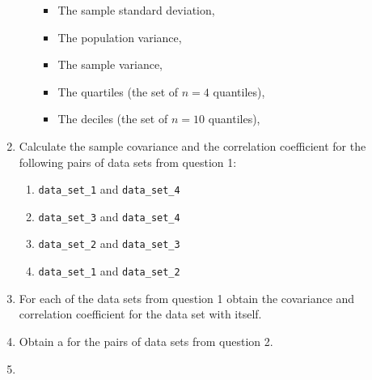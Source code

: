 \begin{enumerate}
\begin{enumerate}
\begin{itemize}
\item 

The sample standard deviation,

\item 

The population variance,

\item 

The sample variance,

\item 

The quartiles (the set of \(n=4\) quantiles),

\item 

The deciles (the set of \(n=10\) quantiles),

\end{itemize}

\end{enumerate}

\item 

Calculate the sample covariance and the correlation coefficient for the
following pairs of data sets from question 1:
\begin{enumerate}

\item 

\texttt{data\_set\_1} and \texttt{data\_set\_4}

\item 

\texttt{data\_set\_3} and \texttt{data\_set\_4}

\item 

\texttt{data\_set\_2} and \texttt{data\_set\_3}

\item 

\texttt{data\_set\_1} and \texttt{data\_set\_2}

\end{enumerate}

\item 

For each of the data sets from question 1 obtain the covariance and
correlation coefficient for the data set with itself.

\item 

Obtain a  for the pairs of data sets from question 2.

\item 


\end{enumerate}

